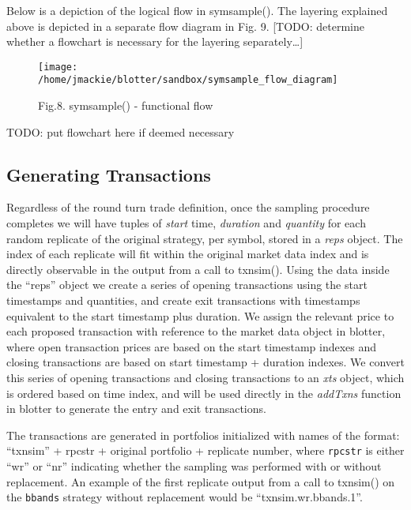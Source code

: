 Below is a depiction of the logical flow in symsample(). The layering
explained above is depicted in a separate flow diagram in Fig. 9.
{[}TODO: determine whether a flowchart is necessary for the layering
separately\ldots{}{]}

\begin{Schunk}
\begin{figure}

{\centering \texttt{[image: /home/jmackie/blotter/sandbox/symsample\_flow\_diagram]} 

}

\caption[Fig.8]{Fig.8. symsample() - functional flow}\label{fig:symsample flow diagram diagram}
\end{figure}
\end{Schunk}

TODO: put flowchart here if deemed necessary

\hypertarget{generating-transactions}{%
\subsection{Generating Transactions}\label{generating-transactions}}

Regardless of the round turn trade definition, once the sampling
procedure completes we will have tuples of \emph{start} time,
\emph{duration} and \emph{quantity} for each random replicate of the
original strategy, per symbol, stored in a \emph{reps} object. The index
of each replicate will fit within the original market data index and is
directly observable in the output from a call to txnsim(). Using the
data inside the ``reps'' object we create a series of opening
transactions using the start timestamps and quantities, and create exit
transactions with timestamps equivalent to the start timestamp plus
duration. We assign the relevant price to each proposed transaction with
reference to the market data object in blotter, where open transaction
prices are based on the start timestamp indexes and closing transactions
are based on start timestamp + duration indexes. We convert this series
of opening transactions and closing transactions to an \emph{xts}
object, which is ordered based on time index, and will be used directly
in the \emph{addTxns} function in blotter to generate the entry and exit
transactions.

The transactions are generated in portfolios initialized with names of
the format: ``txnsim'' + rpcstr + original portfolio + replicate number,
where \texttt{rpcstr} is either ``wr'' or ``nr'' indicating whether the
sampling was performed with or without replacement. An example of the
first replicate output from a call to txnsim() on the \texttt{bbands}
strategy without replacement would be ``txnsim.wr.bbands.1''.


